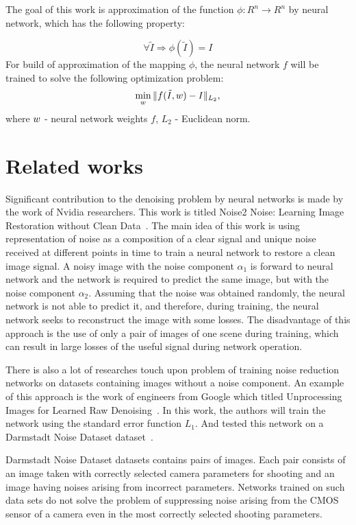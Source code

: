\documentclass[runningheads]{llncs}
\begin{document}
The goal of this work is approximation of the function $\phi: \mathit{R}^n \longrightarrow  \mathit{R}^n$ by neural network, which has the following property:

\begin{equation}\label{eq:main_property}
\forall \tilde{I} \Longrightarrow \phi(\tilde{I}) = I 
\end{equation}
For build of approximation of the mapping $\phi$, the neural network $f$ will be trained to solve the following optimization problem:
\begin{eqnarray}\label{eq:main_min_task}
\min_{\mathnormal{w}} \Arrowvert f(\tilde{I}, \mathnormal{w}) - I \Arrowvert_{L_2}\mathit{ ,}
\end{eqnarray}
where $\mathnormal{w}$ - neural network weights $f$, $L_2$ - Euclidean norm.


\section{Related works}
Significant contribution to the denoising problem by neural networks is made by the work of Nvidia researchers. This work is titled Noise2 Noise: Learning Image Restoration without Clean Data~\cite{noise2noise_paper}. The main idea of this work is using representation of noise as a composition of a clear signal and unique noise received at different points in time to train a neural network to restore a clean image signal. A noisy image with the noise component $\alpha_1$ is forward to neural network and the network is required to predict the same image, but with the noise component $\alpha_2$. Assuming that the noise was obtained randomly, the neural network is not able to predict it, and therefore, during training, the neural network seeks to reconstruct the image with some losses. The disadvantage of this approach is the use of only a pair of images of one scene during training, which can result in large losses of the useful signal during network operation.

There is also a lot of researches touch upon problem of training noise reduction networks on datasets containing images without a noise component. An example of this approach is the work of engineers from Google which titled Unprocessing Images for Learned Raw Denoising~\cite{google_paper}. In this work, the authors will train the network using the standard error function $L_1$. And tested this network on a Darmstadt Noise Dataset dataset~\cite{raw_dataset}.

Darmstadt Noise Dataset datasets contains pairs of images. Each pair consists of an image taken with correctly selected camera parameters for shooting and an image having noises arising from incorrect parameters. Networks trained on such data sets do not solve the problem of suppressing noise arising from the CMOS sensor of a camera even in the most correctly selected shooting parameters.
\end{document}
